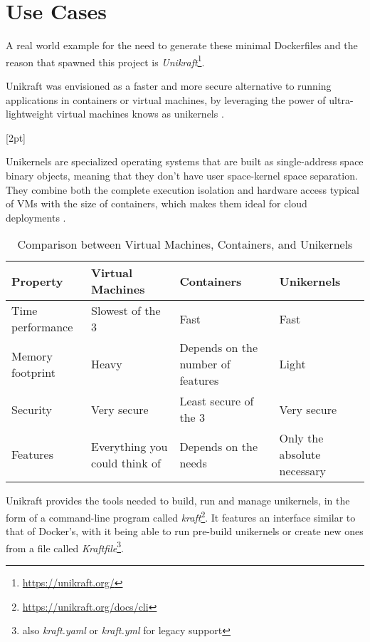 \chapter{Use Cases}
\label{chapter:use-cases}

A real world example for the need to generate these minimal Dockerfiles and
the reason that spawned this project is \textit{Unikraft}\footnote[1]{\url{https://unikraft.org/}}.

Unikraft was envisioned as a faster and more secure alternative to running applications in containers or virtual machines, by
leveraging the power of ultra-lightweight virtual machines knows as unikernels \cite{unikraft}.

[2pt]

Unikernels are specialized operating systems that are built as single-address space binary objects, meaning that they don't 
have user space-kernel space separation. They combine both the complete execution isolation and hardware access typical of VMs with the size of containers,
which makes them ideal for cloud deployments  \cite{unikraft}.

\begin{table}[ht]
\centering
\small
\begin{tabular}{|l|p{3cm}|p{3cm}|p{3cm}|}
\hline
\textbf{Property} & \textbf{Virtual Machines} & \textbf{Containers} & \textbf{Unikernels} \\
\hline
Time performance & Slowest of the 3 & Fast & Fast \\
\hline
Memory footprint & Heavy & Depends on the number of features & Light \\
\hline
Security & Very secure & Least secure of the 3 & Very secure \\
\hline
Features & Everything you could think of & Depends on the needs & Only the absolute necessary \\
\hline
\end{tabular}
\caption{Comparison between Virtual Machines, Containers, and Unikernels \cite{unikraft}}
\label{tab:vm-container-unikernel-comparison}
\end{table}


Unikraft provides the tools needed to build, run and manage unikernels, in the form of a command-line program called \textit{kraft}\footnote{\url{https://unikraft.org/docs/cli}}.
It features an interface similar to that of Docker's, with it being able to run pre-build unikernels or create new ones from a file called \textit{Kraftfile}\footnote{also \textit{kraft.yaml} or \textit{kraft.yml} for legacy support}.

